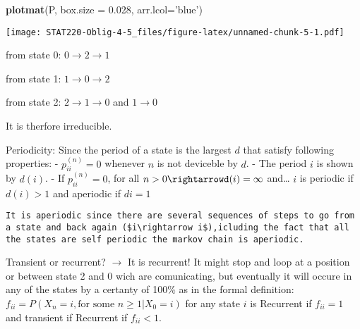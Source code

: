 \documentclass[]{article}
\newenvironment{Shaded}{\begin{snugshade}}{\end{snugshade}}
\newcommand{\DataTypeTok}[1]{\textcolor[rgb]{0.13,0.29,0.53}{#1}}
\newcommand{\FloatTok}[1]{\textcolor[rgb]{0.00,0.00,0.81}{#1}}
\newcommand{\KeywordTok}[1]{\textcolor[rgb]{0.13,0.29,0.53}{\textbf{#1}}}
\newcommand{\NormalTok}[1]{#1}
\newcommand{\StringTok}[1]{\textcolor[rgb]{0.31,0.60,0.02}{#1}}
\begin{document}
\begin{Shaded}
\begin{Highlighting}[]
\KeywordTok{plotmat}\NormalTok{(P, }\DataTypeTok{box.size =} \FloatTok{0.028}\NormalTok{, }\DataTypeTok{arr.lcol=}\StringTok{'blue'}\NormalTok{)}
\end{Highlighting}
\end{Shaded}

\texttt{[image: STAT220-Oblig-4-5\_files/figure-latex/unnamed-chunk-5-1.pdf]}

from state 0: \(0\rightarrow 2\rightarrow 1\)

from state 1: \(1\rightarrow 0\rightarrow 2\)

from state 2: \(2\rightarrow 1\rightarrow 0\) and \(1\rightarrow 0\)

It is therfore irreducible.

Periodicity: Since the period of a state is the largest \(d\) that
satisfy following properties: - \(p_{ii}^{(n)} = 0\) whenever \(n\) is
not deviceble by \(d\). - The period \(i\) is shown by \(d(i)\). - If
\(p_{ii}^{(n)} = 0\), for all \(n>0\rightarrowd(i)=\infty\) and\ldots{}
\(i\) is periodic if \(d(i)>1\) and aperiodic if \(di=1\)

\begin{verbatim}
It is aperiodic since there are several sequences of steps to go from a state and back again ($i\rightarrow i$),icluding the fact that all the states are self periodic the markov chain is aperiodic.
\end{verbatim}

Transient or recurrent? \(\rightarrow\) It is recurrent! It might stop
and loop at a position or between state 2 and 0 wich are comunicating,
but eventually it will occure in any of the states by a certanty of
100\% as in the formal definition:
\(f_{ii}=P(X_{n} = i, \textrm{for some } n≥1|X_{0}=i)\) for any state
\(i\) is Recurrent if \(f_{ii}=1\) and transient if Recurrent if
\(f_{ii}<1\).
\end{document}
